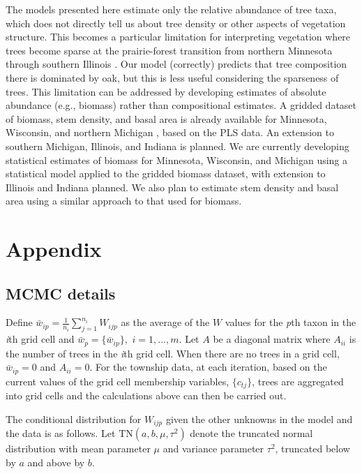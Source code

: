 \documentclass[10pt,letterpaper]{article}
\begin{document}
The models presented here estimate only the relative
abundance of tree taxa, which does not directly tell us about tree
density or other aspects of vegetation structure. This becomes a particular
limitation for interpreting vegetation where trees become sparse at
the prairie-forest transition from northern Minnesota through southern
Illinois \cite{transeau1935prairie}. Our model (correctly) predicts
that tree composition there is dominated by oak, but this is less
useful considering the sparseness of trees. This limitation can be
addressed by developing estimates of absolute abundance (e.g., biomass)
rather than compositional estimates. A gridded dataset of biomass,
stem density, and basal area is already available for Minnesota, Wisconsin,
and northern Michigan \cite{goring2015composition}, based on the
PLS data. An extension to southern Michigan, Illinois, and Indiana
is planned. We are currently developing statistical estimates of biomass
for Minnesota, Wisconsin, and Michigan using a statistical model applied
to the gridded biomass dataset, with extension to Illinois and Indiana
planned. We also plan to estimate stem density and basal area using
a similar approach to that used for biomass.



\section*{Appendix}
\label{SI}

\subsection*{MCMC details}

Define $\bar{w}_{ip}=\frac{1}{n_{i}}{\displaystyle \sum_{j=1}^{n_{i}}W_{ijp}}$
as the average of the $W$ values for the \emph{p}th taxon in the \emph{i}th
grid cell and $\bar{w}_{p}=\{\bar{w}_{ip}\},$ $i=1,\ldots,m$. Let
$A$ be a diagonal matrix where $A_{ii}$ is the number of trees in
the \emph{i}th grid cell. When there are no trees in a grid cell, $\bar{w}_{ip}=0$
and $A_{ii}=0$. For the township data, at each iteration, based on
the current values of the grid cell membership variables, $\{c_{tj}\}$,
trees are aggregated into grid cells and the calculations above can
then be carried out.

The conditional distribution for $W_{ijp}$ given the other unknowns
in the model and the data is as follows. Let $\mbox{TN}(a,b,\mu,\tau^{2})$
denote the truncated normal distribution with mean parameter $\mu$
and variance parameter $\tau^{2}$, truncated below by $a$ and above
by $b$. 
\end{document}
